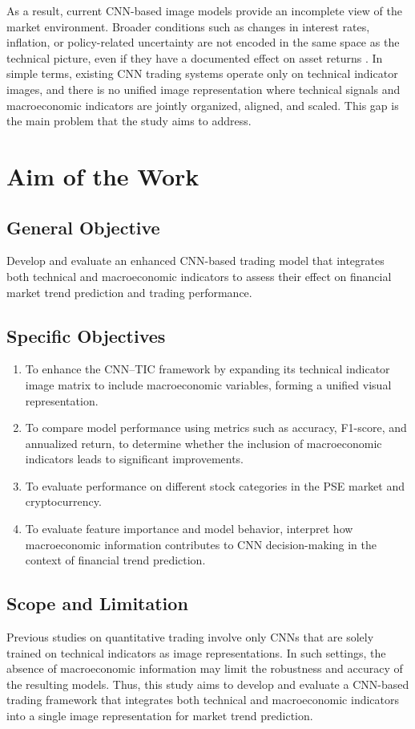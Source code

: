 As a result, current CNN-based image models provide an incomplete view of the market environment. Broader conditions such as changes in interest rates, inflation, or policy-related uncertainty are not encoded in the same space as the technical picture, even if they have a documented effect on asset returns \cite{wang2019aggregating,ma2022macroeconomic,chauhan2025exploring}. In simple terms, existing CNN trading systems operate only on technical indicator images, and there is no unified image representation where technical signals and macroeconomic indicators are jointly organized, aligned, and scaled. This gap is the main problem that the study aims to address.

\section{Aim of the Work}
\subsection{General Objective}

\noindent Develop and evaluate an enhanced CNN-based trading model that integrates both technical and macroeconomic indicators to assess their effect on financial market trend prediction and trading performance.

\subsection{Specific Objectives}
\begin{enumerate}
	\item To enhance the CNN--TIC framework by expanding its technical indicator image matrix to include macroeconomic variables, forming a unified visual representation.
	\item To compare model performance using metrics such as accuracy, F1-score, and annualized return, to determine whether the inclusion of macroeconomic indicators leads to significant improvements.
	\item To evaluate performance on different stock categories in the PSE market and cryptocurrency.
	\item To evaluate feature importance and model behavior, interpret how macroeconomic information contributes to CNN decision-making in the context of financial trend prediction.
\end{enumerate}


\subsection{Scope and Limitation}
Previous studies on quantitative trading involve only CNNs that are solely trained on technical indicators as image representations. In such settings, the absence of macroeconomic information may limit the robustness and accuracy of the resulting models. Thus, this study aims to develop and evaluate a CNN-based trading framework that integrates both technical and macroeconomic indicators into a single image representation for market trend prediction.

